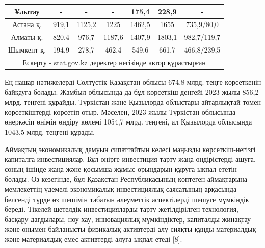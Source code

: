 \begin{table}[H]
{\begin{tabular}{|ccccccc|}
\multicolumn{1}{|c|}{Ұлытау} &
  \multicolumn{1}{c|}{-} &
  \multicolumn{1}{c|}{-} &
  \multicolumn{1}{c|}{-} &
  \multicolumn{1}{c|}{175,4} &
  \multicolumn{1}{c|}{228,9} &
  - \\ \hline
\multicolumn{1}{|c|}{Астана қ.} &
  \multicolumn{1}{c|}{919,1} &
  \multicolumn{1}{c|}{1125,2} &
  \multicolumn{1}{c|}{1225} &
  \multicolumn{1}{c|}{1462,5} &
  \multicolumn{1}{c|}{1655} &
  735,9/80,0 \\ \hline
\multicolumn{1}{|c|}{Алматы қ.} &
  \multicolumn{1}{c|}{820,4} &
  \multicolumn{1}{c|}{976,7} &
  \multicolumn{1}{c|}{1187,6} &
  \multicolumn{1}{c|}{1407,9} &
  \multicolumn{1}{c|}{1803,1} &
  982,7/119,7 \\ \hline
\multicolumn{1}{|c|}{Шымкент қ.} &
  \multicolumn{1}{c|}{194,9} &
  \multicolumn{1}{c|}{278,7} &
  \multicolumn{1}{c|}{462,4} &
  \multicolumn{1}{c|}{549,6} &
  \multicolumn{1}{c|}{661,7} &
  466,8/239,5 \\ \hline
\multicolumn{7}{|c|}{Ескерту - stat.gov.kz деректер негізінде автор құрастырған} \\ \hline
\end{tabular}%
}
\end{table}

\begin{multicols}{2}


Ең нашар нәтижелерді Солтүстік Қазақстан облысы 674,8 млрд. теңге
көрсеткенін байқауға болады. Жамбыл облысында да бұл көрсеткіш деңгейі
2023 жылы 856,2 млрд. теңгені құрайды. Түркістан және Қызылорда
облыстары айтарлықтай төмен көрсеткіштерді көрсетіп отыр. Мәселен, 2023
жылы Түркістан облысында өнеркәсіп өнімін өндіру көлемі 1054,7 млрд.
теңгені, ал Қызылорда облысында 1043,5 млрд. теңгені құрады.

Аймақтың экономикалық дамуын сипаттайтын келесі маңызды
көрсеткіш-негізгі капиталға инвестициялар. Бұл өңірге инвестиция тарту
жаңа өндірістерді ашуға, соның ішінде жаңа және қосымша жұмыс орындарын
құруға ықпал ететін болады. Өз кезегінде, бұл Қазақстан Республикасының
көптеген аймақтарына мемлекеттің үдемелі экономикалық инвестициялық
саясатының арқасында белсенді түрде өз шешімін табатын әлеуметтік
аспектілерді шешуге мүмкіндік береді. Тікелей шетелдік инвестицияларды
тарту жетілдірілген технология, басқару дағдылары, ноу-хау, инновациялық
мүмкіндіктер, капиталды жинақтау және онымен байланысты физикалық
активтерді алу сияқты құнды материалдық және материалдық емес активтерді
алуға ықпал етеді {[}8{]}.

\end{multicols}

